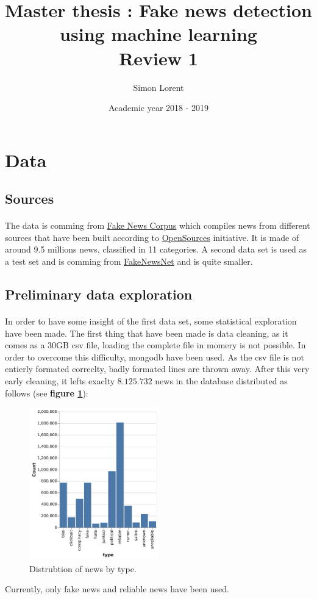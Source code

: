 \documentclass[11pt,a4paper,oneside]{report}
\title{\textbf{Master thesis : Fake news detection using machine learning}
\\ Review 1}
\author{Simon Lorent}
\date{Academic year 2018 - 2019}
\begin{document}
\maketitle
\section{Data}
\subsection{Sources}
\paragraph{} The data is comming from \href{https://github.com/several27/FakeNewsCorpus}{Fake News Corpus} which compiles news from different sources that have been built according to \href{http://www.opensources.co/}{OpenSources} initiative. It is made of around 9.5 millions news, classified in 11 categories. A second data set is used as a test set and is comming from \href{https://github.com/KaiDMML/FakeNewsNet}{FakeNewsNet} and is quite smaller. 

\subsection{Preliminary data exploration}
\paragraph{} In order to have some insight of the first data set, some statistical exploration have been made. The first thing that have been made is data cleaning, as it comes as a 30GB csv file, loading the complete file in momery is not possible. In order to overcome this difficulty, mongodb have been used. As the csv file is not entierly formated correclty, badly formated lines are thrown away. After this very early cleaning, it lefts exaclty $8.125.732$ news in the database distributed as follows (see \textbf{figure \ref{plot:plot1}}):
\vspace{1em}
\begin{figure}[h]
	\centering
	\includegraphics[width=0.5\textwidth]{plot1.pdf}
	\caption{Distrubtion of news by type. }
	\label{plot:plot1}
\end{figure}
Currently, only fake news and reliable news have been used. 
\end{document}
